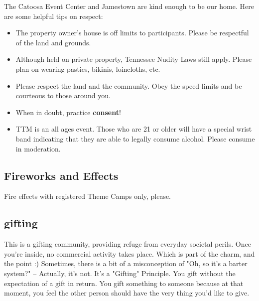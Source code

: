 The Catoosa Event Center and Jamestown are kind enough to be our home.  Here are some helpful tips on respect:
\begin{itemize}[noitemsep]
\item The property owner's house is off limits to participants.  Please be respectful of the land and grounds.
\item Although held on private property, Tennessee Nudity Laws still apply. Please plan on wearing pasties, bikinis, loincloths, etc.
\item Please respect the land and the community.  Obey the speed limits and be courteous to those around you.
\item When in doubt, practice \textbf{consent}!
\item TTM  is an all ages event.  Those who are 21 or older will have a special wrist band indicating that they are able to legally consume alcohol. Please consume in moderation.
\end{itemize}
    




\subsection*{Fireworks and Effects}
Fire effects with registered Theme Camps only, please.

\subsection*{\Gls{gifting}}\label{gifting}
This is a gifting community, providing refuge from everyday societal perils.  Once you're inside, no commercial activity takes place. Which is part of the charm, and the point :) 
Sometimes, there is a bit of a misconception of "Oh, so it's a barter system?" -- Actually, it's not. It's a "Gifting" Principle.
You gift without the expectation of a gift in return. 
You gift something to someone because at that moment, you feel the other person should have the very thing you'd like to give.

